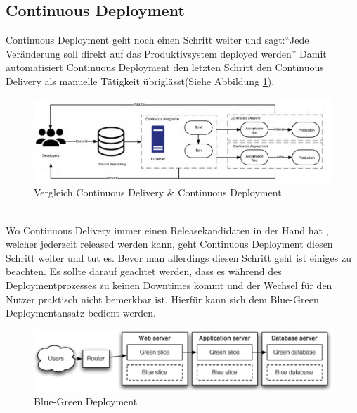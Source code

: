 \subsection{Continuous Deployment}
Continuous Deployment geht noch einen Schritt weiter und sagt:\enquote{Jede Veränderung soll direkt auf das Produktivsystem deployed werden}\autocite[Vgl.][S.17]{Stahl.2018} Damit automatisiert Continuous Deployment den letzten Schritt den Continuous Delivery als manuelle Tätigkeit übriglässt(Siehe Abbildung \ref{img:cde2}).
\begin{figure}[h!]
	\centering
	\includegraphics[scale = 0.6]{img/CDE2.png}
	\caption{Vergleich Continuous Delivery \& Continuous Deployment}
	\label{img:cde2}
\end{figure}\\
 Wo Continuous Delivery immer einen Releasekandidaten in der Hand hat , welcher jederzeit released werden kann, geht Continuous Deployment diesen Schritt weiter und tut es.\autocite[Vgl.][S.17]{Stahl.2018} Bevor man allerdings diesen Schritt geht ist einiges zu beachten. Es sollte darauf geachtet werden, dass es während des Deploymentprozesses zu keinen Downtimes kommt und der Wechsel für den Nutzer praktisch nicht bemerkbar ist. Hierfür kann sich dem Blue-Green Deploymentansatz bedient werden.\autocite[Vgl.][S.407]{Farley.2010}
\begin{figure}[h!]
 	\centering
 	\includegraphics[scale = 1]{img/blue.jpg}
 	\caption{Blue-Green Deployment}
 	\label{img:blue}
\end{figure}
